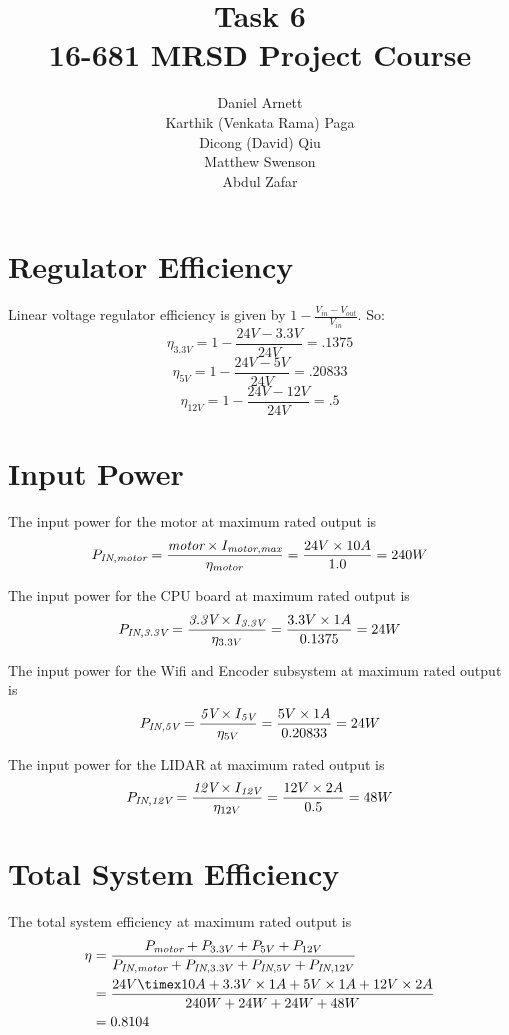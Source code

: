 \documentclass[11pt]{article}
\title{Task 6\\ \vspace{2mm}\Large{16-681 MRSD Project Course }}
\author{
  Daniel Arnett \\
    Karthik (Venkata Rama) Paga\\
  Dicong (David) Qiu\\
  Matthew Swenson\\
  Abdul Zafar
}
\begin{document}
  \maketitle
    \newpage

\section{Regulator Efficiency} Linear voltage regulator efficiency is given by $1-\frac{V_{in}-V_{out}}{V_{in}}$.  So: 
$$\eta_{3.3V} = 1-\frac{24V-3.3V}{24V} = .1375$$
$$\eta_{5V} = 1-\frac{24V-5V}{24V} = .20833$$
$$\eta_{12V} = 1-\frac{24V-12V}{24V} = .5$$


\section{Input Power}

The input power for the motor at maximum rated output is 
$$
P_{\textit{IN},\textit{motor}} = \frac{\textit{\textit{motor}} \times I_{\textit{motor}, \textit{max}} }{\eta_{motor}} = \frac{24V \times 10A}{1.0} = 240W
$$

The input power for the CPU board at maximum rated output is 
$$
P_{\textit{IN},\textit{3.3V}} = \frac{\textit{\textit{3.3V}} \times I_{\textit{3.3V}} }{\eta_{3.3V}} = \frac{3.3V \times 1A}{0.1375} = 24W
$$

The input power for the Wifi and Encoder subsystem at maximum rated output is 
$$
P_{\textit{IN},\textit{5V}} = \frac{\textit{\textit{5V}} \times I_{\textit{5V}} }{\eta_{5V}} = \frac{5V \times 1A}{0.20833} = 24W
$$

The input power for the LIDAR at maximum rated output is 
$$
P_{\textit{IN},\textit{12V}} = \frac{\textit{\textit{12V}} \times I_{\textit{12V}} }{\eta_{12V}} = \frac{12V \times 2A}{0.5} = 48W
$$


\section{Total System Efficiency}

The total system efficiency at maximum rated output is 
$$
\begin{align*}
    \eta &= \frac{P_{\textit{motor}} + P_{3.3V} + P_{5V} + P_{12V}}{P_{\textit{IN}, \textit{motor}} + P_{\textit{IN}, 3.3V} + P_{\textit{IN}, 5V} + P_{\textit{IN}, 12V}} \\
    &= \frac{24V \timex 10A + 3.3V \times 1A + 5V \times 1A + 12V \times 2A}{240W + 24W + 24W + 48W} \\
    &= 0.8104
\end{align*}
$$
\end{document}
